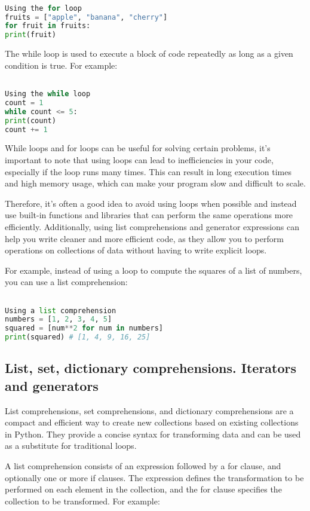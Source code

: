 \documentclass[12pt, a4paper, oneside]{article}
\begin{document}
\begin{lstlisting}[language=Python, frame=single]

Using the for loop
fruits = ["apple", "banana", "cherry"]
for fruit in fruits:
print(fruit)
\end{lstlisting}

The while loop is used to execute a block of code repeatedly as long as a given condition is true. For example:

\begin{lstlisting}[language=Python, frame=single]

Using the while loop
count = 1
while count <= 5:
print(count)
count += 1
\end{lstlisting}

While loops and for loops can be useful for solving certain problems, it's important to note that using loops can lead to inefficiencies in your code, especially if the loop runs many times. This can result in long execution times and high memory usage, which can make your program slow and difficult to scale.

Therefore, it's often a good idea to avoid using loops when possible and instead use built-in functions and libraries that can perform the same operations more efficiently. Additionally, using list comprehensions and generator expressions can help you write cleaner and more efficient code, as they allow you to perform operations on collections of data without having to write explicit loops.

For example, instead of using a loop to compute the squares of a list of numbers, you can use a list comprehension:

\begin{lstlisting}[language=Python, frame=single]

Using a list comprehension
numbers = [1, 2, 3, 4, 5]
squared = [num**2 for num in numbers]
print(squared) # [1, 4, 9, 16, 25]
\end{lstlisting}
\subsection{ List, set, dictionary comprehensions. Iterators and generators }
List comprehensions, set comprehensions, and dictionary comprehensions are a compact and efficient way to create new collections based on existing collections in Python. They provide a concise syntax for transforming data and can be used as a substitute for traditional loops.

A list comprehension consists of an expression followed by a for clause, and optionally one or more if clauses. The expression defines the transformation to be performed on each element in the collection, and the for clause specifies the collection to be transformed. For example:
\end{document}
